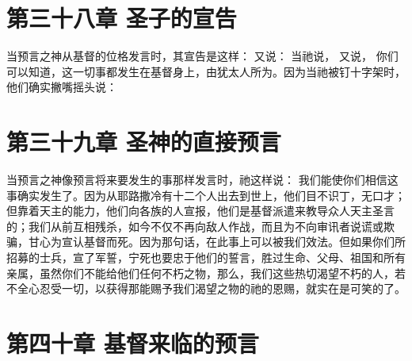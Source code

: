 
\section{第三十八章 圣子的宣告}

当预言之神从基督的位格发言时，其宣告是这样：  又说：  当祂说， 又说， 你们可以知道，这一切事都发生在基督身上，由犹太人所为。因为当祂被钉十字架时，他们确实撇嘴摇头说： \par


\section{第三十九章 圣神的直接预言}

当预言之神像预言将来要发生的事那样发言时，祂这样说：  我们能使你们相信这事确实发生了。因为从耶路撒冷有十二个人出去到世上，他们目不识丁，无口才；但靠着天主的能力，他们向各族的人宣报，他们是基督派遣来教导众人天主圣言的；我们从前互相残杀，如今不仅不再向敌人作战，而且为不向审讯者说谎或欺骗，甘心为宣认基督而死。因为那句话，在此事上可以被我们效法。但如果你们所招募的士兵，宣了军誓，宁死也要忠于他们的誓言，胜过生命、父母、祖国和所有亲属，虽然你们不能给他们任何不朽之物，那么，我们这些热切渴望不朽的人，若不全心忍受一切，以获得那能赐予我们渴望之物的祂的恩赐，就实在是可笑的了。\par


\section{第四十章 基督来临的预言}

